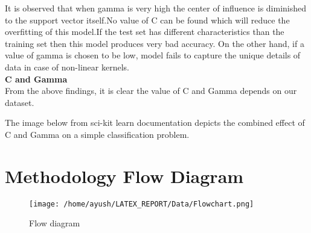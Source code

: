 \documentclass{report}
\begin{document}
It is observed that when gamma is very high the center of influence is diminished to the support vector itself.No value of C can be found which will reduce the overfitting of this model.If the test set has different characteristics than the training set then this model produces very bad accuracy.
On the other hand, if a value of gamma is chosen to be low, model fails to capture the unique details of data in case of non-linear kernels.\\ \linebreak
\linebreak
\textbf{C and Gamma}\\
\linebreak
From the above findings, it is clear the value of C and Gamma depends on our dataset.

The image below from sci-kit learn documentation depicts the combined effect of C and Gamma on a simple classification problem.\\
\pagebreak
\pagebreak
\pagebreak
{}
\section{\Huge Methodology Flow Diagram}
\begin{figure}[!h]
  \texttt{[image: /home/ayush/LATEX\_REPORT/Data/Flowchart.png]}
  \caption{Flow diagram}
  \label{Fig:2}
\end{figure}
\pagebreak
\end{document}
